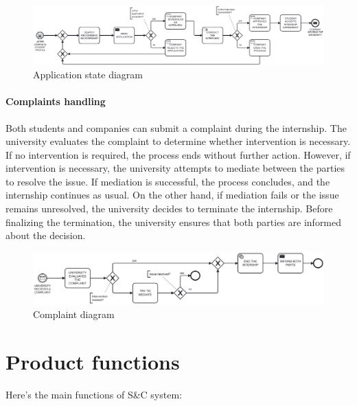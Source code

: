 \begin{figure}[H]
    \centering
    \includegraphics[width=1\linewidth]{Images//state diagrams/APPLICATION.png}
    \caption{Application state diagram}
    \label{fig:enter-label}
\end{figure}

\paragraph{Complaints handling} Both students and companies can submit a complaint during the internship. The university evaluates the complaint to determine whether intervention is necessary. If no intervention is required, the process ends without further action. However, if intervention is necessary, the university attempts to mediate between the parties to resolve the issue. If mediation is successful, the process concludes, and the internship continues as usual. On the other hand, if mediation fails or the issue remains unresolved, the university decides to terminate the internship. Before finalizing the termination, the university ensures that both parties are informed about the decision.

\begin{figure}[H]
    \centering
    \includegraphics[width=1\linewidth]{Images//state diagrams/COMPLAINTS.png}
    \caption{Complaint diagram}
    \label{fig:enter-label}
\end{figure}

\section{Product functions}
\label{sec:product_functions}%

Here's the main functions of S\&C system:

